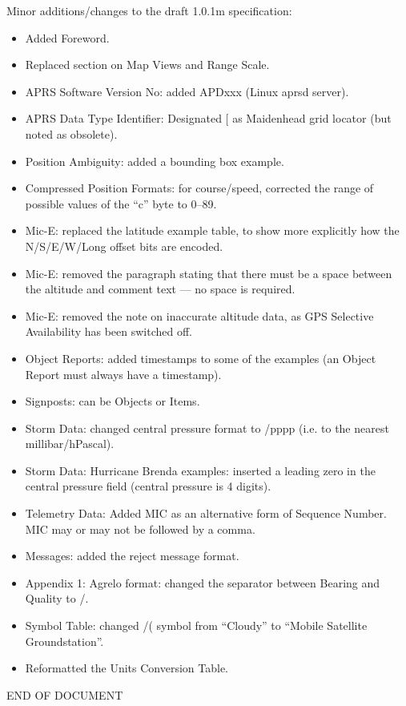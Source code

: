 Minor additions/changes to the draft 1.0.1m specification:
\begin{itemize}
\item  Added Foreword.
\item  Replaced section on Map Views and Range Scale.
\item  APRS Software Version No: added APDxxx (Linux aprsd server).
\item  APRS Data Type Identifier: Designated [ as Maidenhead grid locator (but noted as obsolete).
\item  Position Ambiguity: added a bounding box example.
\item  Compressed Position Formats: for course/speed, corrected the range of possible values of the
“c” byte to 0–89.
\item  Mic-E: replaced the latitude example table, to show more explicitly how the N/S/E/W/Long
offset bits are encoded.
\item  Mic-E: removed the paragraph stating that there must be a space between the altitude and
comment text — no space is required.
\item  Mic-E: removed the note on inaccurate altitude data, as GPS Selective Availability has been
switched off.
\item  Object Reports: added timestamps to some of the examples (an Object Report must always
have a timestamp).
\item  Signposts: can be Objects or Items.
\item  Storm Data: changed central pressure format to /pppp (i.e. to the nearest millibar/hPascal).
\item  Storm Data: Hurricane Brenda examples: inserted a leading zero in the central pressure field
(central pressure is 4 digits).
\item  Telemetry Data: Added MIC as an alternative form of Sequence Number. MIC may or may
not be followed by a comma.
\item  Messages: added the reject message format.
\item  Appendix 1: Agrelo format: changed the separator between Bearing and Quality to /.
\item  Symbol Table: changed /( symbol from “Cloudy” to “Mobile Satellite Groundstation”.
\item  Reformatted the Units Conversion Table.

\end{itemize}

END OF DOCUMENT
